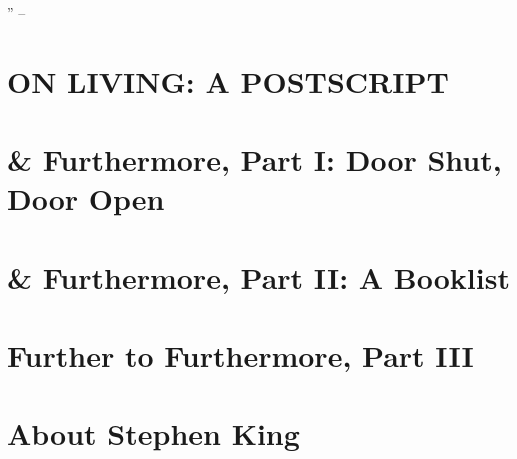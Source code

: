 \documentclass{article}
\numberwithin{equation}{section}
\begin{document}
'' -- \cite[pp. 108--107]{King2010}


\section{ON LIVING: A POSTSCRIPT}


\section{\& Furthermore, Part I: Door Shut, Door Open}


\section{\& Furthermore, Part II: A Booklist}


\section{Further to Furthermore, Part III}


\section{About Stephen King}


\printbibliography[heading=bibintoc]
	
\end{document}
